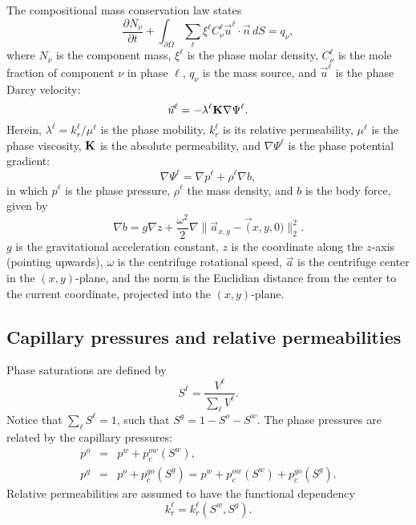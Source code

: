 

The compositional mass conservation law states
\cite{allen1988,peaceman1978}
\begin{equation}
  \frac{\partial N_\nu}{\partial t} + \int_{\partial\Omega}
  \sum_\ell \xi^\ell C_\nu^\ell \vec u^\ell\cdot\vec n\, dS = q_\nu,
\end{equation}
where $N_\nu$ is the component mass, $\xi^\ell$ is the phase molar
density, $C_\nu^\ell$ is the mole fraction of component $\nu$ in phase
$\ell$, $q_\nu$ is the mass source, and $\vec u^\ell$ is the phase
Darcy velocity:
\begin{equation}
  \vec u^\ell = -\lambda^\ell {\textbf K}\nabla\Psi^\ell.
\end{equation}
Herein, $\lambda^\ell=k_r^\ell/\mu^\ell$ is the phase mobility,
$k_r^\ell$ is its relative permeability, $\mu^\ell$ is the phase
viscosity, ${\textbf K}$ is the absolute permeability, and
$\nabla\Psi^\ell$ is the phase potential gradient:
\begin{equation}
  \nabla\Psi^\ell = \nabla p^\ell + \rho^\ell \nabla b,
\end{equation}
in which $p^\ell$ is the phase pressure, $\rho^\ell$ the mass
density, and $b$ is the body force, given by
\begin{equation}
  \nabla b = g \nabla z + \frac{\omega^2}{2}
   \nabla\|\vec a_{x,y} - \vec (x,y,0)\|_2^2.
\end{equation}
$g$ is the gravitational acceleration
constant, $z$ is the coordinate along the $z$-axis (pointing upwards),
$\omega$ is the centrifuge rotational speed, $\vec a$ is the centrifuge
center in the $(x,y)$-plane, and the norm is the Euclidian distance from
the center to the current coordinate, projected into the $(x,y)$-plane.


\subsection{Capillary pressures and relative permeabilities}

Phase saturations are defined by
\begin{equation}
  S^\ell = \frac{V^\ell}{\sum_\ell V^\ell}.
\end{equation}
Notice that $\sum_\ell S^\ell=1$, such that $S^g=1-S^o-S^w$. The phase
pressures are related by the capillary pressures:
\begin{eqnarray}
  p^o & = & p^w + p_c^{ow}\left(S^w\right), \\
  p^g & = & p^o + p_c^{go}\left(S^g\right) =
  p^w + p_c^{ow}\left(S^w\right) + p_c^{go}\left(S^g\right).
\end{eqnarray}
Relative permeabilities are assumed to have the functional dependency
\begin{equation}
  k_r^\ell = k_r^\ell\left( S^w, S^g \right).
\end{equation}

